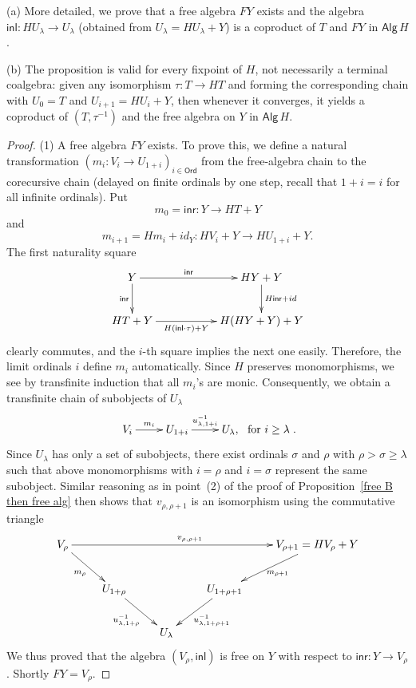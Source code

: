 \documentclass{LMCS}
\theoremstyle{plain}
\theoremstyle{definition}
\numberwithin{equation}{section}
\begin{document}
\begin{rem}
(a) More detailed, we prove that a free algebra $FY$ exists and the algebra $\mathsf{inl}:HU_\lambda\rightarrow U_\lambda$ (obtained from $U_\lambda=HU_\lambda+Y$) is a coproduct of $T$ and $FY$ in $\mathsf{Alg}\, H$.

(b) The proposition is valid for every fixpoint of $H$, not necessarily a terminal coalgebra: given any isomorphism $\tau:T\rightarrow HT$ and forming the corresponding chain with $U_0=T$ and $U_{i+1}=HU_i+Y$, then  whenever it converges, it yields a coproduct of $(T,\tau^{-1})$ and the free algebra on $Y$ in $\mathsf{Alg}\, H$.
\end{rem}
\begin{proof}(1) A free algebra $FY$ exists. To prove this, we define a natural transformation $(m_i:V_i\rightarrow U_{1+i})_{i\in \mathsf{Ord}}$ from the free-algebra chain to the corecursive chain (delayed on finite ordinals by one step, recall that $1+i=i$ for all infinite ordinals). Put $$m_0=\mathsf{inr}:Y\rightarrow HT+Y$$
and $$m_{i+1}=Hm_i+id_Y:HV_i+Y\rightarrow HU_{1+i}+Y.$$
The first naturality square
$$
\xymatrix{
Y\ar[rr]^-{\mathsf{inr}}\ar[d]_-{\mathsf{inr}}&&HY+Y\ar[d]^-{H\mathsf{inr}+id}\\
HT+Y\ar[rr]_-{H(\mathsf{inl}\cdot\tau)+Y}&&H(HY+Y)+Y
}
$$
 clearly commutes, and the $i$-th square implies the next one easily. Therefore, the limit ordinals $i$ define $m_i$ automatically. Since $H$ preserves monomorphisms, we see by transfinite induction that all $m_i$'s are monic. Consequently, we obtain a transfinite chain of subobjects of $U_\lambda$
 $$\xymatrix{V_i\ar[r]^-{m_i}& U_{1+i}\ar[r]^-{u_{\lambda, 1+i}^{-1}}& U_\lambda,\ \ {\rm for} \ i\geq\lambda}.$$
Since $U_{\lambda}$ has only a set of subobjects, there exist ordinals $\sigma$ and $\rho$ with $\rho > \sigma\geq \lambda$ such that above monomorphisms with $i=\rho$ and $i=\sigma$ represent the same subobject. Similar reasoning as in point~(2) of the proof of Proposition~\ref{free B then free alg} then shows that $v_{\rho,\rho+1}$ is an isomorphism using the commutative triangle
$$
\xymatrix{
V_\rho
\ar[rrrr]^{v_{\rho,\rho+1}}
\ar[dr]_{m_\rho}
&&&&
V_{\rho+1}=HV_\rho+Y
\ar[dl]^{m_{\rho+1}}
\\
&U_{1+\rho}\ar[dr]_{u_{\lambda,1+\rho}^{-1}}&&U_{1+\rho+1}\ar[dl]^{u^{-1}_{\lambda,1+\rho+1}}\\
&&U_\lambda
}
$$
We thus proved that the algebra $(V_\rho,\mathsf{inl})$ is free on $Y$ with respect to $\mathsf{inr}:Y\rightarrow V_\rho$. Shortly $FY=V_\rho$.


\end{proof}
\end{document}
